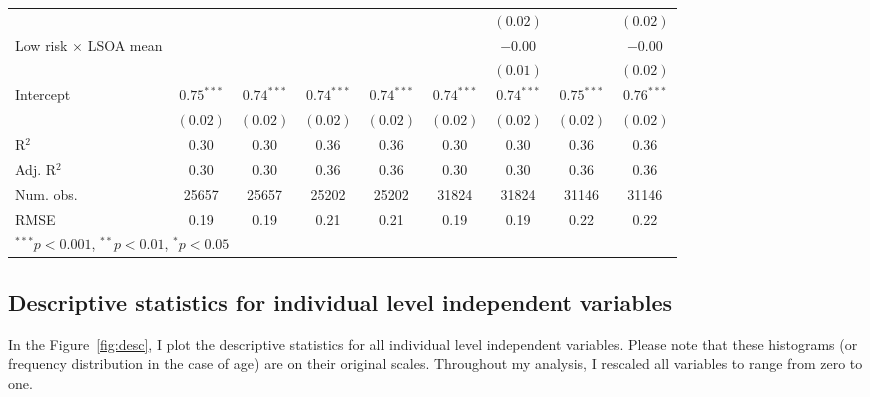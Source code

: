 \documentclass[12pt, letter]{scrartcl}
\begin{document}
\begin{tiny}
\begin{longtable}{lcccccccc}
                                            &               &               &               &               &               & $(0.02)$      &               & $(0.02)$      \\
Low risk $\times$ LSOA mean                 &               &               &               &               &               & $-0.00$       &               & $-0.00$       \\
                                            &               &               &               &               &               & $(0.01)$      &               & $(0.02)$      \\
Intercept                                   & $0.75^{***}$  & $0.74^{***}$  & $0.74^{***}$  & $0.74^{***}$  & $0.74^{***}$  & $0.74^{***}$  & $0.75^{***}$  & $0.76^{***}$  \\
                                            & $(0.02)$      & $(0.02)$      & $(0.02)$      & $(0.02)$      & $(0.02)$      & $(0.02)$      & $(0.02)$      & $(0.02)$      \\
\hline
R$^2$                                       & 0.30          & 0.30          & 0.36          & 0.36          & 0.30          & 0.30          & 0.36          & 0.36          \\
Adj. R$^2$                                  & 0.30          & 0.30          & 0.36          & 0.36          & 0.30          & 0.30          & 0.36          & 0.36          \\
Num. obs.                                   & 25657         & 25657         & 25202         & 25202         & 31824         & 31824         & 31146         & 31146         \\
RMSE                                        & 0.19          & 0.19          & 0.21          & 0.21          & 0.19          & 0.19          & 0.22          & 0.22          \\
\toprule[1.5pt]
\multicolumn{9}{l}{\scriptsize{$^{***}p<0.001$, $^{**}p<0.01$, $^*p<0.05$}}
\end{longtable}
\end{tiny}


\subsection{Descriptive statistics for individual level independent variables}

In the Figure~\ref{fig:desc}, I plot the descriptive statistics for all individual level independent variables. Please note that these histograms (or frequency distribution in the case of age) are on their original scales. Throughout my analysis, I rescaled all variables to range from zero to one.
\end{document}
